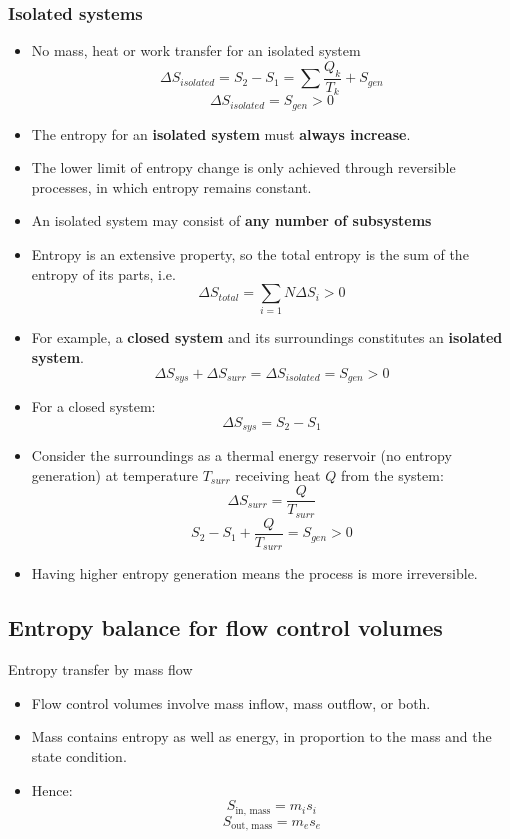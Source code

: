 \documentclass[11pt]{article}
\begin{document}
\subsubsection{Isolated systems}
\label{sec:org2ffb6ca}
\begin{itemize}
\item No mass, heat or work transfer for an isolated system
\[\Delta S_{isolated} = S_2 - S_1 = \sum \frac{Q_k}{T_k} + S_{gen}\]
\[\Delta S_{isolated} = S_{gen} > 0\]
\item The entropy for an \textbf{isolated system} must \textbf{always increase}.
\item The lower limit of entropy change is only achieved through reversible processes, in which entropy remains constant.
\item An isolated system may consist of \textbf{any number of subsystems}
\item Entropy is an extensive property, so the total entropy is the sum of the entropy of its parts, i.e.
\[\Delta S_{total} = \sum_{i = 1}{N} \Delta S_i > 0\]
\item For example, a \textbf{closed system} and its surroundings constitutes an \textbf{isolated system}.
\[\Delta S_{sys} + \Delta S_{surr} = \Delta S_{isolated} = S_{gen} > 0\]
\item For a closed system:
\[\Delta S_{sys} = S_2 - S_1\]
\item Consider the surroundings as a thermal energy reservoir (no entropy generation) at temperature \(T_{surr}\) receiving heat \(Q\) from the system:
\[\Delta S_{surr} = \frac{Q}{T_{surr}}\]
\[S_2 - S_1 + \frac{Q}{T_{surr}} = S_{gen} > 0\]
\item Having higher entropy generation means the process is more irreversible.
\end{itemize}

\subsection{Entropy balance for flow control volumes}
\label{sec:orgeef7c84}
Entropy transfer by mass flow
\begin{itemize}
\item Flow control volumes involve mass inflow, mass outflow, or both.
\item Mass contains entropy as well as energy, in proportion to the mass and the state condition.
\item Hence:
\[S_{\text{in, mass}} = m_i s_i\]
\[S_{\text{out, mass}} = m_e s_e\]
\end{itemize}
\end{document}
